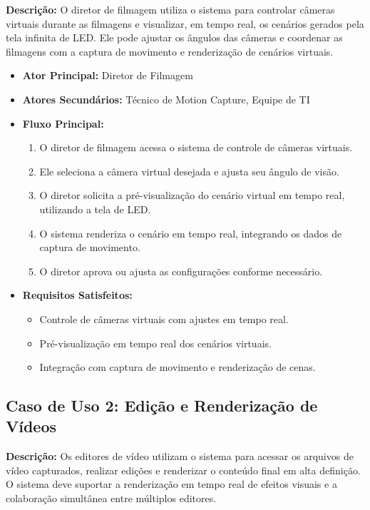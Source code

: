 \textbf{Descrição:} O diretor de filmagem utiliza o sistema para controlar câmeras virtuais durante as filmagens e visualizar, em tempo real, os cenários gerados pela tela infinita de LED. Ele pode ajustar os ângulos das câmeras e coordenar as filmagens com a captura de movimento e renderização de cenários virtuais.

\begin{itemize}
  \item \textbf{Ator Principal:} Diretor de Filmagem
  \item \textbf{Atores Secundários:} Técnico de Motion Capture, Equipe de TI
  \item \textbf{Fluxo Principal:}
    \begin{enumerate}
      \item O diretor de filmagem acessa o sistema de controle de câmeras virtuais.
      \item Ele seleciona a câmera virtual desejada e ajusta seu ângulo de visão.
      \item O diretor solicita a pré-visualização do cenário virtual em tempo real, utilizando a tela de LED.
      \item O sistema renderiza o cenário em tempo real, integrando os dados de captura de movimento.
      \item O diretor aprova ou ajusta as configurações conforme necessário.
    \end{enumerate}
  \item \textbf{Requisitos Satisfeitos:}
    \begin{itemize}
      \item Controle de câmeras virtuais com ajustes em tempo real.
      \item Pré-visualização em tempo real dos cenários virtuais.
      \item Integração com captura de movimento e renderização de cenas.
    \end{itemize}
\end{itemize}

\subsection{Caso de Uso 2: Edição e Renderização de Vídeos}

\textbf{Descrição:} Os editores de vídeo utilizam o sistema para acessar os arquivos de vídeo capturados, realizar edições e renderizar o conteúdo final em alta definição. O sistema deve suportar a renderização em tempo real de efeitos visuais e a colaboração simultânea entre múltiplos editores.

